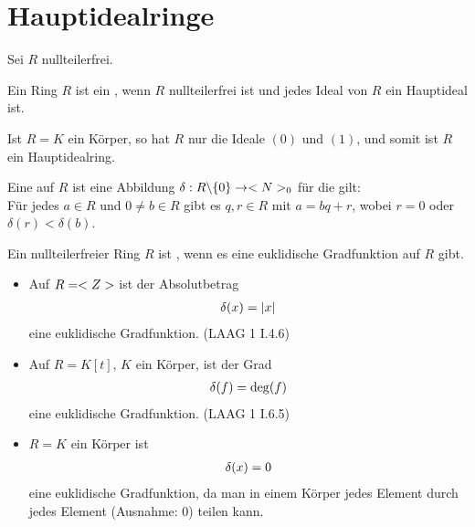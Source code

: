 \section{Hauptidealringe}

Sei $R$ nullteilerfrei.

\begin{definition}[Hauptidealring]
	Ein Ring $R$ ist ein , wenn $R$ nullteilerfrei ist und jedes Ideal von $R$ ein Hauptideal ist.
\end{definition}

\begin{example}
	Ist $R=K$ ein Körper, so hat $R$ nur die Ideale $(0)$ und $(1)$, und somit ist $R$ ein Hauptidealring.
\end{example}

\begin{definition}
	Eine  auf $R$ ist eine Abbildung $\delta:R\backslash \{0\}\to <N>_0$ für die gilt: \\
	Für jedes $a\in R$ und $0\neq b\in R$ gibt es $q,r\in R$ mit $a=bq+r$, wobei $r=0$ oder $\delta(r)<\delta(b)$.
	
	Ein nullteilerfreier Ring $R$ ist , wenn es eine euklidische Gradfunktion auf $R$ gibt.
\end{definition}

\begin{example}
	\begin{itemize}
		\item Auf $R=<Z>$ ist der Absolutbetrag 
		\begin{align}
			\delta(x)=\vert x\vert\notag
		\end{align}
		eine euklidische Gradfunktion. (LAAG 1 I.4.6) %
		\item Auf $R=K[t]$, $K$ ein Körper, ist der Grad
		\begin{align}
			\delta(f) =\deg(f)\notag
		\end{align}
		eine euklidische Gradfunktion. (LAAG 1 I.6.5) %
		\item $R=K$ ein Körper ist 
		\begin{align}
			\delta(x)=0\notag
		\end{align}
		eine euklidische Gradfunktion, da man in einem Körper jedes Element durch jedes Element (Ausnahme: 0) teilen kann.
	\end{itemize}
\end{example}

